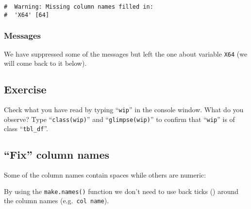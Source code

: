 \documentclass[a4paper,9pt,twocolumn,twoside,]{pinp}
\begin{document}
\begin{ShadedResult}
\begin{verbatim}
#  Warning: Missing column names filled in:
#  'X64' [64]
\end{verbatim}
\end{ShadedResult}

\hypertarget{messages}{%
\subsubsection{Messages}\label{messages}}

We have suppressed some of the messages but left the one about variable
\texttt{X64} (we will come back to it below).

\hypertarget{exercise-1}{%
\subsection{Exercise}\label{exercise-1}}

Check what you have read by typing ``\texttt{wip}'' in the console
window. What do you observe? Type ``\texttt{class(wip)}'' and
``\texttt{glimpse(wip)}'' to confirm that ``\texttt{wip}'' is of class
``\texttt{tbl\_df}''.

\hypertarget{fix-column-names}{%
\subsection{``Fix'' column names}\label{fix-column-names}}

Some of the column names contain spaces while others are numeric:

\begin{Shaded}
\begin{Highlighting}[]
\NormalTok{(}
\NormalTok{(}
\end{Highlighting}
\end{Shaded}

By using the \texttt{make.names()} function we don't need to use back
ticks (\texttt{\textasciigrave{}}) around the column names
(e.g.~\texttt{\textasciigrave{}col\ name\textasciigrave{}}).

\begin{Shaded}
\begin{Highlighting}[]
\StringTok{ }\NormalTok{(}
\NormalTok{(}
\NormalTok{(}
\end{Highlighting}
\end{Shaded}
\end{document}
